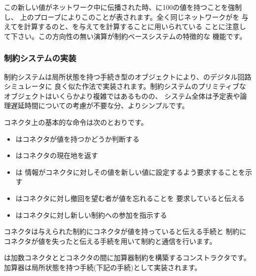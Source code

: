 \noindent
この新しい値がネットワーク中に伝播された時、に100の値を持つことを強制し、
上のプローブによりこのことが表されます。全く同じネットワークがを
与えてを計算するのと、を与えてを計算することに用いられている
ことに注意して下さい。この方向性の無い演算が制約ベースシステムの特徴的な
機能です。

\subsubsection*{制約システムの実装}



制約システムは局所状態を持つ手続き型のオブジェクトにより、のデジタル回路シミュレータに
良く似た作法で実装されます。制約システムのプリミティブなオブジェクトはいくらかより複雑ではあるものの、
システム全体は予定表や論理遅延時間についての考慮が不要な分、よりシンプルです。


コネクタ上の基本的な命令は次のとおりです。

\begin{itemize}

\item
{}はコネクタが値を持つかどうか判断する

\item
{}はコネクタの現在地を返す

\item
{}は
情報がコネクタに対しその値を新しい値に設定するよう要求することを示す

\item
{}はコネクタに対し撤回を望む者が値を忘れることを
要求していると伝える

\item
{}はコネクタに対し新しい制約への参加を指示する

\end{itemize}

\noindent
コネクタは与えられた制約にコネクタが値を持っていると伝える手続と
制約にコネクタが値を失ったと伝える手続を用いて制約と通信を行います。


は加数コネクタととコネクタの間に加算器制約を構築するコンストラクタです。
加算器は局所状態を持つ手続(下記の手続)として実装されます。

